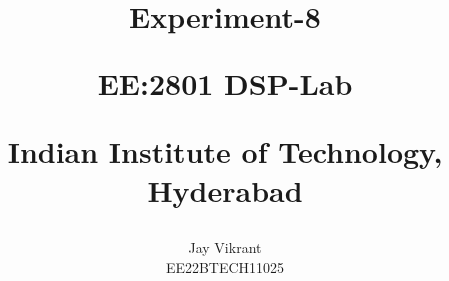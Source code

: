 \documentclass[journal,12pt,onecolumn]{IEEEtran}
\theoremstyle{remark}
\begin{document}
%




\vspace{3cm}

\title{
Experiment-8

\large{EE:2801 DSP-Lab}

Indian Institute of Technology, Hyderabad
}
\author{Jay Vikrant

EE22BTECH11025
}	


%
%
%

% 
%



% 
\end{document}
